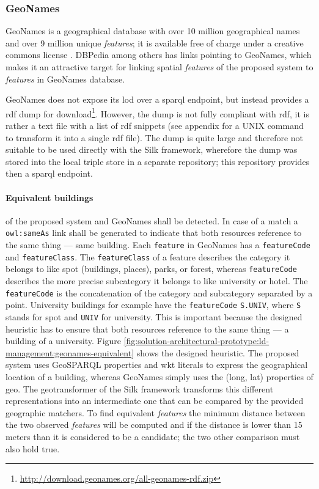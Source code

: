 \documentclass[draft,final]{vutinfth} %
\begin{document}
\subsubsection{GeoNames}

GeoNames is a geographical database with over 10 million geographical names and over 9 million unique \textit{features}; it is available free of charge under a creative commons license \cite{volz_discovering_2009}. DBPedia among others has links pointing to GeoNames, which makes it an attractive target for linking spatial \textit{features} of the proposed system to \textit{features} in GeoNames database.  

GeoNames does not expose its \gls{lod} over a \gls{sparql} endpoint, but instead provides a \gls{rdf} dump for download\footnote{\url{http://download.geonames.org/all-geonames-rdf.zip}}. However, the dump is not fully compliant with \gls{rdf}, it is rather a text file with a list of \gls{rdf} snippets (see appendix for a UNIX command to transform it into a single \gls{rdf} file). The dump is quite large and therefore not suitable to be used directly with the Silk framework, wherefore the dump was stored into the local triple store in a separate repository; this repository provides then a \gls{sparql} endpoint. 

\paragraph{Equivalent buildings} of the proposed system and GeoNames shall be detected. In case of a match a \texttt{owl:sameAs} link shall be generated to indicate that both resources reference to the same thing --- same building. Each \texttt{feature} in GeoNames has a \texttt{featureCode} and \texttt{featureClass}. The \texttt{featureClass} of a feature describes the category it belongs to like spot (buildings, places), parks, or forest, whereas \texttt{featureCode} describes the more precise subcategory it belongs to like university or hotel. The \texttt{featureCode} is the concatenation of the category and subcategory separated by a point. University buildings for example have the \texttt{featureCode} \texttt{S.UNIV}, where \texttt{S} stands for spot and \texttt{UNIV} for university. This is important because the designed heuristic has to ensure that both resources reference to the same thing --- a building of a university. Figure \ref{fig:solution-architectural-prototype:ld-management:geonames-equivalent} shows the designed heuristic. The proposed system uses GeoSPARQL properties and \gls{wkt} literals to express the geographical location of a building, whereas GeoNames simply uses the (long, lat) properties of \gls{geo}. The geotransformer of the Silk framework transforms this different representations into an intermediate one that can be compared by the provided geographic matchers. To find equivalent \textit{features} the minimum distance between the two observed \textit{features} will be computed and if the distance is lower than 15 meters than it is considered to be a candidate; the two other comparison must also hold true.  
\end{document}
